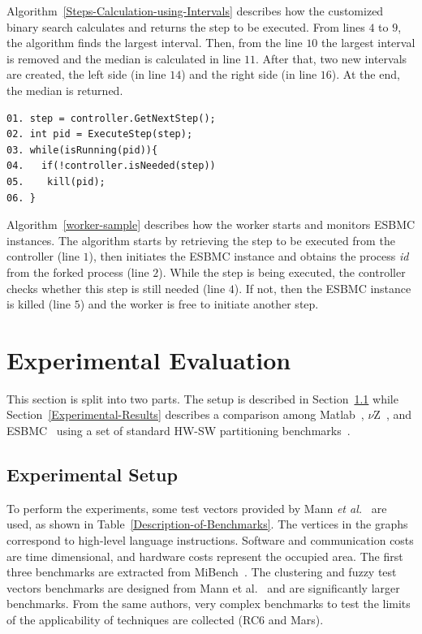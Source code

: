 Algorithm~\ref{Steps-Calculation-using-Intervals} describes how the customized binary search calculates and returns the step to be executed. From lines $4$ to $9$, the algorithm finds the largest interval. Then, from the line $10$ the largest interval is removed and the median is calculated in line $11$. After that, two new intervals are created, the left side (in line $14$) and the right side (in line $16$). At the end, the median is returned.

\begin{lstlisting}[caption=Worker sample,label=worker-sample]
01. step = controller.GetNextStep();
02. int pid = ExecuteStep(step);
03. while(isRunning(pid)){
04.   if(!controller.isNeeded(step))
05.    kill(pid);
06. }     
\end{lstlisting}

Algorithm~\ref{worker-sample} describes how the worker starts and monitors ESBMC instances. The algorithm starts by retrieving the step to be executed from the controller (line $1$), then initiates the ESBMC instance and obtains the process \textit{id} from the forked process (line $2$). While the step is being executed, the controller checks whether this step is still needed (line $4$). If not, then the ESBMC instance is killed (line $5$) and the worker is free to initiate another step.


\section{Experimental Evaluation}
\label{Experimental-Evaluation}

This section is split into two parts. The setup is described in Section~\ref{Experimental-Setup} while Section~\ref{Experimental-Results} describes a comparison among Matlab~\cite{TheMathWorks2013}, $\nu$Z~\cite{Bjorner2015}, and ESBMC~\cite{Trindade2015} using a set of standard HW-SW partitioning benchmarks~\cite{Mann2007}.

\subsection{Experimental Setup}
\label{Experimental-Setup}

To perform the experiments, some test vectors provided by Mann {\it et al.}~\cite{Mann2007} are used, as shown in Table~\ref{Description-of-Benchmarks}. The vertices in the graphs correspond to high-level language instructions. Software and communication costs are time dimensional, and hardware costs represent the occupied area. The first three benchmarks are extracted from MiBench~\cite{Guthaus2001}. The clustering and fuzzy test vectors benchmarks are designed from Mann et al.~\cite{Mann2007} and are significantly larger benchmarks. From the same authors,  very complex benchmarks to test the limits of the applicability of techniques are collected (RC$6$ and Mars).

